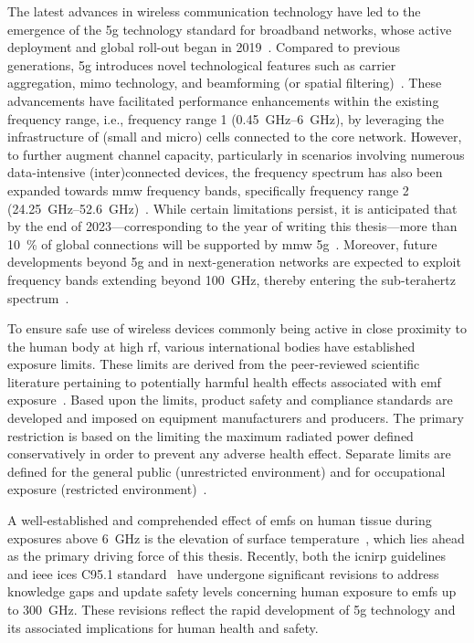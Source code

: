 The latest advances in wireless communication technology have led to the emergence of the \gls{5g} technology standard for broadband networks, whose active deployment and global roll-out began in 2019~\cite{GSA2019rollout}.
Compared to previous generations, \gls{5g} introduces novel technological features such as carrier aggregation, \gls{mimo} technology, and beamforming (or spatial filtering)~\cite{Andrews2014What}.
These advancements have facilitated performance enhancements within the existing frequency range, i.e., frequency range 1 (\SIrange{0.45}{6}{\GHz}), by leveraging the infrastructure of (small and micro) cells connected to the core network.
However, to further augment channel capacity, particularly in scenarios involving numerous data-intensive (inter)connected devices, the frequency spectrum has also been expanded towards \gls{mmw} frequency bands, specifically frequency range 2 (\SIrange{24.25}{52.6}{\GHz})~\cite{Rappaport2013Millimeter}.
While certain limitations persist, it is anticipated that by the end of 2023---corresponding to the year of writing this thesis---more than \SI{10}{\percent} of global connections will be supported by \gls{mmw} \gls{5g}~\cite{CISCO2023report}.
Moreover, future developments beyond \gls{5g} and in next-generation networks are expected to exploit frequency bands extending beyond \SI{100}{\GHz}, thereby entering the sub-terahertz spectrum~\cite{Ericsson20236g,Yao2023Study}.

To ensure safe use of wireless devices commonly being active in close proximity to the human body at high \gls{rf}, various international bodies have established exposure limits.
These limits are derived from the peer-reviewed scientific literature pertaining to potentially harmful health effects associated with \gls{emf} exposure~\cite{ICNIRP2020Principles}.
Based upon the limits, product safety and compliance standards are developed and imposed on equipment manufacturers and producers.
The primary restriction is based on the limiting the maximum radiated power defined conservatively in order to prevent any adverse health effect.
Separate limits are defined for the general public (unrestricted environment) and for occupational exposure (restricted environment)~\cite{Hirata2021Assessment}.

A well-established and comprehended effect of \gls{emf}s on human tissue during exposures above \SI{6}{\GHz} is the elevation of surface temperature~\cite{Ziskin2018Tissue}, which lies ahead as the primary driving force of this thesis.
Recently, both the \gls{icnirp} guidelines~\cite{ICNIRP2020Guidelines} and \gls{ieee} \gls{ices} C95.1 standard~\cite{IEEE2019Standard} have
undergone significant revisions to address knowledge gaps and update safety levels concerning human exposure to \gls{emf}s up to \SI{300}{\GHz}.
These revisions reflect the rapid development of \gls{5g} technology and its associated implications for human health and safety.

